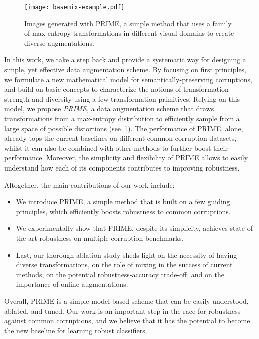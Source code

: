 \documentclass[runningheads]{llncs}
\begin{document}
\begin{figure}[t]
    \centering
    \texttt{[image: basemix-example.pdf]}
    \caption{Images generated with PRIME, a simple method that uses a family of max-entropy transformations in different visual domains to create diverse augmentations.}
    \vspace*{-2mm}
    \label{fig:BaseMix_example}
\end{figure}





In this work, we take a step back and provide a systematic way for designing a simple, yet effective data augmentation scheme. By focusing on first principles, we formulate a new mathematical model for semantically-preserving corruptions, and build on basic concepts to characterize the notions of transformation strength and diversity using a few transformation primitives. Relying on this model, we propose \emph{PRIME}, a data augmentation scheme that draws transformations from a max-entropy distribution to efficiently sample from a large space of possible distortions (see~\cref{fig:BaseMix_example}). The performance of PRIME, alone, already tops the current baselines on different common corruption datasets, whilst it can also be combined with other methods to further boost their performance. Moreover, the simplicity and flexibility of PRIME allows to easily understand how each of its components contributes to improving robustness.

\noindent Altogether, the main contributions of our work include:
\begin{itemize}
    \item[] We introduce PRIME, a simple method that is built on a few guiding principles, which efficiently boosts robustness to common corruptions.
    \item[] We experimentally show that PRIME, despite its simplicity, achieves state-of-the-art robustness on multiple corruption benchmarks.  
    \item[] Last, our thorough ablation study sheds light on the necessity of having diverse transformations, on the role of mixing in the success of current methods, on the potential robustness-accuracy trade-off, and on the importance of online augmentations.
\end{itemize}

Overall, PRIME is a simple model-based scheme that can be easily understood, ablated, and tuned. Our work is an important step in the race for robustness against common corruptions, and we believe that it has the potential to become the new baseline for learning robust classifiers.
\end{document}
